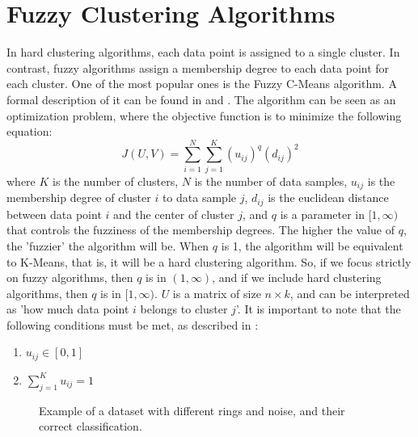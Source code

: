 \documentclass[conference]{IEEEtran}
\begin{document}
\section{Fuzzy Clustering Algorithms}
In hard clustering algorithms, each data point is assigned to a single cluster. In contrast, fuzzy algorithms assign a membership degree to each data point for each cluster.
One of the most popular ones is the Fuzzy C-Means algorithm. A formal description of it can be found in \cite{bookpatternrecognition} and \cite{BEZDEK1984191}. The algorithm can be seen as an optimization problem,
where the objective function is to minimize the following equation:
\begin{equation}
J(U, V) = \sum_{i=1}^{N} \sum_{j=1}^{K} (u_{ij})^q (d_{ij})^2
\end{equation}
where $K$ is the number of clusters, $N$ is the number of data samples, $u_{ij}$ is the membership degree of cluster $i$ to data sample $j$,
$d_{ij}$ is the euclidean distance between data point $i$ and the center of cluster $j$, and $q$ is a parameter in $[1, \infty)$ that controls the fuzziness of the membership degrees.
The higher the value of $q$, the 'fuzzier' the algorithm will be. When $q$ is 1, the algorithm will be equivalent to K-Means, that is, it will be a hard clustering algorithm.
So, if we focus strictly on fuzzy algorithms, then $q$ is in $(1, \infty)$, and if we include hard clustering algorithms, then $q$ is in $[1, \infty)$.
$U$ is a matrix of size $n \times k$, and can be interpreted as 'how much data point $i$ belongs to cluster $j$'.
It is important to note that the following conditions must be met, as described in \cite{BEZDEK1984191}:
\begin{enumerate}
    \item $u_{ij} \in [0, 1]$
    \item $\sum_{j=1}^{K} u_{ij} = 1$
\end{enumerate}

\begin{figure}[t]
    \centering
    \resizebox{0.9\linewidth}{!}{}
    \label{fig:noisy_rings}
    \caption{Example of a dataset with different rings and noise, and their correct classification.}
\end{figure}
\end{document}
